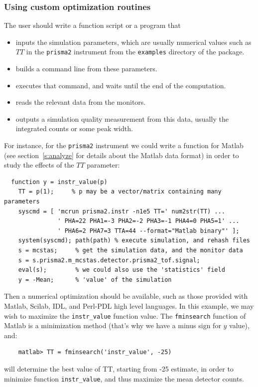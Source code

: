 \subsubsection{Using custom optimization routines}
The user should write a function script or a program that
\begin{itemize}
\item inputs the simulation parameters, which are usually numerical values such as $TT$ in the \verb+prisma2+ instrument from the \verb+examples+ directory of the package.
\item builds a command line from these parameters.
\item executes that command, and waits until the end of the computation.
\item reads the relevant data from the monitors.
\item outputs a simulation quality measurement from this data, usually the integrated counts or some peak width.
\end{itemize}

For instance, for the \verb+prisma2+ instrument we could write a function for Matlab (see section~\ref{s:analyze} for details about the Matlab data format) in order to study the effects of the $TT$ parameter:
\begin{lstlisting}
  function y = instr_value(p)
    TT = p(1);     % p may be a vector/matrix containing many parameters
    syscmd = [ 'mcrun prisma2.instr -n1e5 TT=' num2str(TT) ...
               ' PHA=22 PHA1=-3 PHA2=-2 PHA3=-1 PHA4=0 PHA5=1' ...
               ' PHA6=2 PHA7=3 TTA=44 --format="Matlab binary"' ];
    system(syscmd); path(path) % execute simulation, and rehash files
    s = mcstas;     % get the simulation data, and the monitor data
    s = s.prisma2.m_mcstas.detector.prisma2_tof.signal;
    eval(s);        % we could also use the 'statistics' field
    y = -Mean;      % 'value' of the simulation
\end{lstlisting}

Then a numerical optimization should be available, such as those provided with Matlab, Scilab, IDL, and Perl-PDL high level languages. In this example, we may wish to maximize the \verb+instr_value+ function value. The \verb+fminsearch+ function of Matlab is a minimization method (that's why we have a minus sign for $y$ value), and:
\begin{lstlisting}
    matlab> TT = fminsearch('instr_value', -25)
\end{lstlisting}
will determine the best value of TT, starting from -25 estimate, in order to minimize function \verb+instr_value+, and thus maximize the mean detector counts.

